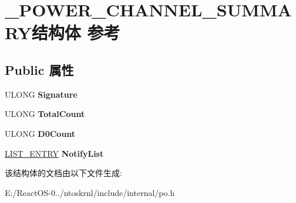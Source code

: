 \hypertarget{struct___p_o_w_e_r___c_h_a_n_n_e_l___s_u_m_m_a_r_y}{}\section{\+\_\+\+P\+O\+W\+E\+R\+\_\+\+C\+H\+A\+N\+N\+E\+L\+\_\+\+S\+U\+M\+M\+A\+R\+Y结构体 参考}
\label{struct___p_o_w_e_r___c_h_a_n_n_e_l___s_u_m_m_a_r_y}
\subsection*{Public 属性}
\begin{DoxyCompactItemize}
\item 
\mbox{\label{struct___p_o_w_e_r___c_h_a_n_n_e_l___s_u_m_m_a_r_y_ade1f543a97fc1d6dc33173b1b23f7932}} 
U\+L\+O\+NG {\bfseries Signature}
\item 
\mbox{\label{struct___p_o_w_e_r___c_h_a_n_n_e_l___s_u_m_m_a_r_y_afe3bb5da5c961637309bf104bab1e451}} 
U\+L\+O\+NG {\bfseries Total\+Count}
\item 
\mbox{\label{struct___p_o_w_e_r___c_h_a_n_n_e_l___s_u_m_m_a_r_y_a4743122d92a6fa959707be47136222f1}} 
U\+L\+O\+NG {\bfseries D0\+Count}
\item 
\mbox{\label{struct___p_o_w_e_r___c_h_a_n_n_e_l___s_u_m_m_a_r_y_a1f59e8c87e763ee19c42017c5cb76550}} 
\hyperlink{struct___l_i_s_t___e_n_t_r_y}{L\+I\+S\+T\+\_\+\+E\+N\+T\+RY} {\bfseries Notify\+List}
\end{DoxyCompactItemize}


该结构体的文档由以下文件生成\+:\begin{DoxyCompactItemize}
\item 
E\+:/\+React\+O\+S-\/0../ntoskrnl/include/internal/po.\+h\end{DoxyCompactItemize}
